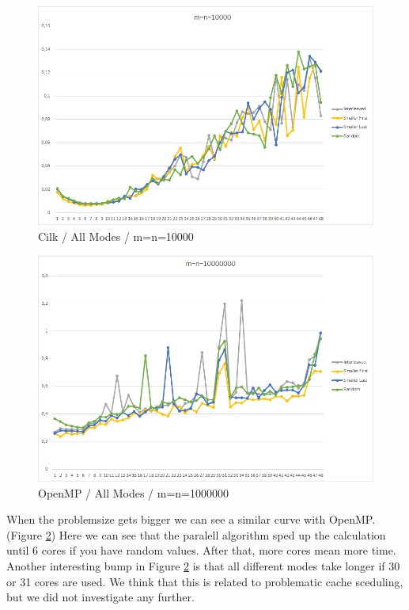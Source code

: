 \documentclass[12pt,a4paper,titlepage,oneside]{scrartcl}
\begin{document}
\begin{figure}[h]
\includegraphics[width=\linewidth, height=0.6\linewidth]{Saturn_Cilk_10000}
\caption{Cilk / All Modes / m=n=10000}
\label{fig:cilk_allm_10000}
\end{figure}
\begin{figure}[h]
\includegraphics[width=\linewidth, height=0.6\linewidth]{Saturn_OpenMP_10000000}
\caption{OpenMP / All Modes / m=n=1000000}
\label{fig:omp_allm_10000000}
\end{figure}

When the problemsize gets bigger we can see a similar curve with OpenMP. (Figure \ref{fig:omp_allm_10000000}) Here  we can see that the paralell algorithm sped up the calculation until 6 cores if you have random values. After that, more cores mean more time. Another interesting bump in Figure \ref{fig:omp_allm_10000000} is that all different modes take longer if 30 or 31 cores are used. We think that this is related to problematic cache sceduling, but we did not investigate any further.
\end{document}
